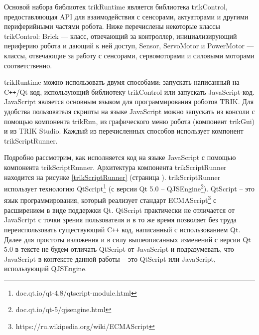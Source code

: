 \documentclass[14pt]{matmex-diploma-custom}
\begin{document}
Основой набора библиотек trikRuntime является библиотека trikControl, предоставляющая API для взаимодействия с сенсорами, актуаторами и другими периферийными частями робота. Ниже перечислены некоторые классы trikControl: Brick — класс, отвечающий за контроллер, инициализирующий периферию робота и дающий к ней доступ, Sensor, ServoMotor и PowerMotor — классы, отвечающие за работу с сенсорами, сервомоторами и силовыми моторами соответственно.


trikRuntime можно использовать двумя способами: запускать написанный на C\texttt{++}/Qt код, использующий библиотеку trikControl или запускать JavaScript-код. JavaScript является основным языком для программирования роботов TRIK. Для удобства пользователя скрипты на языке JavaScript можно запускать из консоли с помощью компонента trikRun, из графического меню робота (компонент trikGui) и из TRIK Studio. Каждый из перечисленных способов использует компонент trikScriptRunner.

Подробно рассмотрим, как исполняется код на языке JavaScript с помощью компонента trikScriptRunner. Архитектура компонента trikScriptRunner находится на рисунке \ref{trikScriptRunner} (страница \pageref{trikScriptRunner}). trikScriptRunner использует технологию QtScript\footnote{doc.qt.io/qt-4.8/qtscript-module.html} (с версии Qt 5.0 -- QJSEngine\footnote{doc.qt.io/qt-5/qjsengine.html}). QtScript -- это язык программирования, который реализует стандарт ECMAScript\footnote{https://ru.wikipedia.org/wiki/ECMAScript} с расширением в виде поддержки Qt. QtScript практически не отличается от JavaScript с точки зрения пользователя и в то же время позволяет без труда переиспользовать существующий C\texttt{++} код, написанный с использованием Qt. Далее для простоты изложения и в силу вышеописанных изменений с версии Qt 5.0 в тексте не будем отличать QtScript от JavaScript и подразумевать, что JavaScript в контексте данной работы -- это QtScript или JavaScript, использующий QJSEngine.
\end{document}
